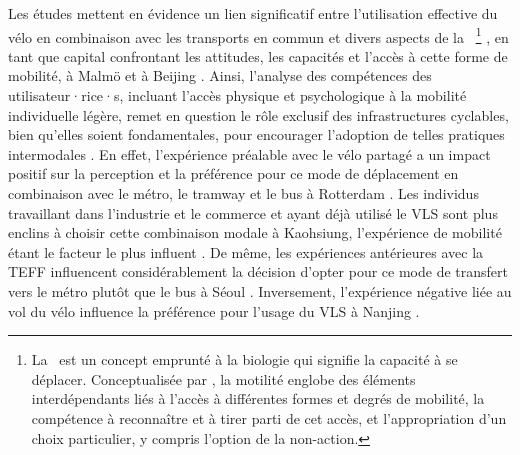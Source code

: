 \begin{refsegment}
Les études mettent en évidence un lien significatif entre l'utilisation effective du vélo en combinaison avec les transports en commun et divers aspects de la ~\footnote{
    La ~est un concept emprunté à la biologie qui signifie la capacité à se déplacer. Conceptualisée par \textcolor{blue}{\textcite[750]{kaufmann_motility_2004}}, la motilité englobe des éléments interdépendants liés à l'accès à différentes formes et degrés de mobilité, la compétence à reconnaître et à tirer parti de cet accès, et l'appropriation d'un choix particulier, y compris l'option de la non-action.
} \textcolor{blue}{\autocite[750]{kaufmann_motility_2004}}, en tant que capital confrontant les attitudes, les capacités et l'accès à cette forme de mobilité, à Malmö et à Beijing \textcolor{blue}{\autocite[7-15]{hamidi_shaping_2020}}. Ainsi, l'analyse des compétences des utilisateur·rice·s, incluant l'accès physique et psychologique à la mobilité individuelle légère, remet en question le rôle exclusif des infrastructures cyclables, bien qu'elles soient fondamentales, pour encourager l'adoption de telles pratiques intermodales \textcolor{blue}{\autocite[686]{hamidi_inequalities_2019}}. En effet, l'expérience préalable avec le vélo partagé a un impact positif sur la perception et la préférence pour ce mode de déplacement en combinaison avec le métro, le tramway et le bus à Rotterdam \textcolor{blue}{\autocite[6]{montes_shared_2023}}. Les individus travaillant dans l'industrie et le commerce et ayant déjà utilisé le \acrshort{VLS} sont plus enclins à choisir cette combinaison modale à Kaohsiung, l'expérience de mobilité étant le facteur le plus influent \textcolor{blue}{\autocite[24]{cheng_expanding_2018}}. De même, les expériences antérieures avec la \acrshort{TEFF} influencent considérablement la décision d'opter pour ce mode de transfert vers le métro plutôt que le bus à Séoul \textcolor{blue}{\autocite[9]{baek_electric_2021}}. Inversement, l'expérience négative liée au vol du vélo influence la préférence pour l'usage du \acrshort{VLS} à Nanjing \textcolor{blue}{\autocite[19]{ji_public_2017}}.%


\end{refsegment}
